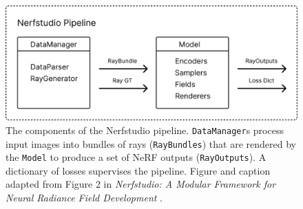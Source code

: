 \begin{figure}[!h]
    \centering
    \includegraphics[width=1.0\textwidth]{figures/nerfstudio-pipeline-components.png}
    \caption[The components of the Nerfstudio pipeline.]{The components of the Nerfstudio pipeline. \texttt{DataManager}s process input images into bundles of rays (\texttt{RayBundles}) that are rendered by the \texttt{Model} to produce a set of NeRF outputs (\texttt{RayOutputs}). A dictionary of losses supervises the pipeline. Figure and caption adapted from Figure 2 in \textit{Nerfstudio: A Modular Framework for Neural Radiance Field Development} \cite{tancik_nerfstudio_2023}.}
    \label{fig:nerfstudio-pipeline-components}
\end{figure}
